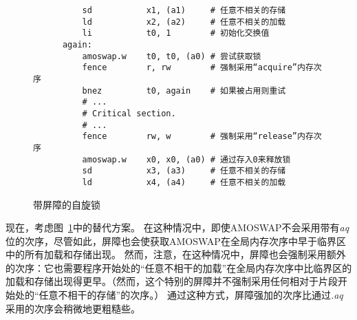 \begin{figure}[h!]
  \centering\small
  \begin{verbatim}
          sd           x1, (a1)     # 任意不相关的存储 
          ld           x2, (a2)     # 任意不相关的加载 
          li           t0, 1        # 初始化交换值 
      again:
          amoswap.w    t0, t0, (a0) # 尝试获取锁
          fence        r, rw        # 强制采用“acquire”内存次序
          bnez         t0, again    # 如果被占用则重试
          # ...
          # Critical section.
          # ...
          fence        rw, w        # 强制采用“release”内存次序
          amoswap.w    x0, x0, (a0) # 通过存入0来释放锁 
          sd           x3, (a3)     # 任意不相关的存储 
          ld           x4, (a4)     # 任意不相关的加载
  \end{verbatim}
  \caption{带屏障的自旋锁}
  \label{fig:litmus:spinlock_fences}
\end{figure}

现在，考虑图~\ref{fig:litmus:spinlock_fences}中的替代方案。
在这种情况中，即使AMOSWAP不会采用带有{\em aq}位的次序，尽管如此，屏障也会使获取AMOSWAP在全局内存次序中早于临界区中的所有加载和存储出现。
然而，注意，在这种情况中，屏障也会强制采用额外的次序：它也需要程序开始处的“任意不相干的加载”在全局内存次序中比临界区的加载和存储出现得更早。（然而，这个特别的屏障并不强制采用任何相对于片段开始处的“任意不相干的存储”的次序。）
通过这种方式，屏障强加的次序比通过{\em .aq}采用的次序会稍微地更粗糙些。

